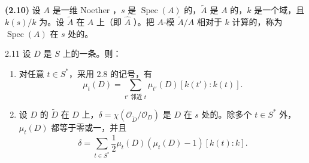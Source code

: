 \textbf{(2.10)} 设 $A$ 是一维 Noether ，$s$ 是 $\operatorname{Spec}(A)$ 的，$\widetilde A$ 是 $A$ 的，$k$ 是一个域，且 $k(s)/k$ 为。设 $\widetilde A$ 在 $A$ 上（即 $\widehat A$ ）。把 $A$-模 $\widetilde A/A$ 相对于 $k$ 计算的，称为 $\operatorname{Spec}(A)$ 在 $s$ 处的。
\begin{SGAresult}{}{2.11}
设 $D$ 是 $S$ 上的一条。则：
\begin{enumerate}
\item[(i)] 对任意 $t\in S^*$，采用 2.8 的记号，有
\[
\mu_t(D)=\sum_{t'\text{ 邻近 }t}\mu_{t'}(D)[k(t'):k(t)].
\]
\item[(ii)] 设 $D$ 的 $\widetilde D$ 在 $D$ 上，$\delta=\chi(\mathcal O_{\widetilde D}/\mathcal O_D)$ 是 $D$ 在 $s$ 处的。除多个 $t\in S^*$ 外，$\mu_t(D)$ 都等于零或一，并且
\[
\delta=\sum_{t\in S^*}\frac12\mu_t(D)(\mu_t(D)-1)[k(t):k].
\]
\end{enumerate}
\end{SGAresult}
